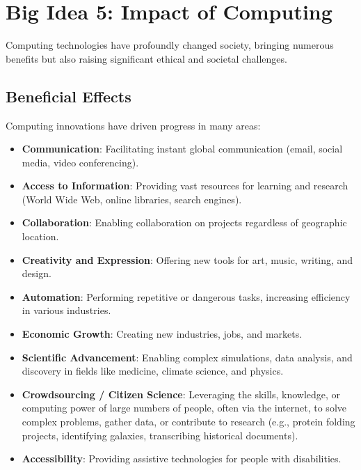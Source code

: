 \documentclass[11pt,oneside]{book}
\begin{document}
\chapter{Big Idea 5: Impact of Computing}
\label{chap:impact_computing}
Computing technologies have profoundly changed society, bringing numerous benefits but also raising significant ethical and societal challenges.

\section{Beneficial Effects}
\label{sec:beneficial_effects}
Computing innovations have driven progress in many areas:
\begin{itemize}
    \item \textbf{Communication}: Facilitating instant global communication (email, social media, video conferencing).
    \item \textbf{Access to Information}: Providing vast resources for learning and research (World Wide Web, online libraries, search engines).
    \item \textbf{Collaboration}: Enabling collaboration on projects regardless of geographic location.
    \item \textbf{Creativity and Expression}: Offering new tools for art, music, writing, and design.
    \item \textbf{Automation}: Performing repetitive or dangerous tasks, increasing efficiency in various industries.
    \item \textbf{Economic Growth}: Creating new industries, jobs, and markets.
    \item \textbf{Scientific Advancement}: Enabling complex simulations, data analysis, and discovery in fields like medicine, climate science, and physics.
    \item \textbf{Crowdsourcing / Citizen Science}: Leveraging the skills, knowledge, or computing power of large numbers of people, often via the internet, to solve complex problems, gather data, or contribute to research (e.g., protein folding projects, identifying galaxies, transcribing historical documents).
    \item \textbf{Accessibility}: Providing assistive technologies for people with disabilities.
\end{itemize}
\end{document}
